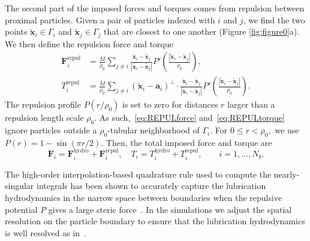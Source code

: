 \documentclass[lineno]{jfm}
\renewcommand{\aa}{\mathbf{a}}
\newcommand{\FF}{\mathbf{F}}
\newcommand{\xx}{\mathbf{x}}
\begin{document}
The second part of the imposed forces and torques comes from repulsion
between proximal particles. Given a pair of particles indexed with $i$ and
$j$, we find the two points $\tilde{\xx}_i \in \Gamma_i$ and
$\tilde{\xx}_j \in \Gamma_j$ that are closest to one another (Figure \ref{fig:figure0}a). We then
define the repulsion force and torque
\begin{align}
  \label{eq:REPULforce}
  \FF_i^{\text{repul}} &= \frac{M}{\rho_0} \sum_{j \neq i} 
    \frac{\tilde{\xx}_i - \tilde{\xx}_j}
    {|\tilde{\xx}_i - \tilde{\xx}_j|} 
     P'\left(\frac{|\tilde{\xx}_i - \tilde{\xx}_j|}{\rho_0}\right), \\
  \label{eq:REPULtorque}
  T_i^{\text{repul}} &= \frac{M}{\rho_0} \sum_{j \neq i} 
    (\tilde{\xx}_i - \aa_i)^{\perp} \cdot 
    \frac{\tilde{\xx}_i - \tilde{\xx}_j}
    {|\tilde{\xx}_i - \tilde{\xx}_j|} 
     P'\left(\frac{|\tilde{\xx}_i - \tilde{\xx}_j|}{\rho_0}\right).
\end{align}
The repulsion profile $P(r/\rho_0)$ is set to zero for distances $r$ larger than a
repulsion length scale $\rho_0$. As such,~\eqref{eq:REPULforce}
and~\eqref{eq:REPULtorque} ignore particles outside a
$\rho_0$-tubular neighborhood of $\Gamma_i$. For $0 \leq r < \rho_0,$ we use
$P(r) = 1 - \sin(\pi r/2)$.
Then, the total imposed force and torque
are
\begin{equation}
\label{eq:total_forces}
  \FF_i = \FF_i^{\text{hydro}} + \FF_i^{\text{repul}},\quad
  T_i = T_i^{\text{hydro}} + T_i^{\text{repul}}, \qquad
  i=1,\ldots,N_b.
\end{equation}

The high-order interpolation-based quadrature rule used to compute the
nearly-singular integrals has been shown to accurately capture the
lubrication hydrodynamics in the narrow space between boundaries when
the repulsive potential $P$ gives a large steric
force~\citep{qua-bir2014}. In the simulations we adjust the spatial
resolution on the particle boundary to ensure that the lubrication
hydrodynamics is well resolved as in~\citep{qua-vee-you2019,
qua-gan-you2021}.

%



\end{document}
